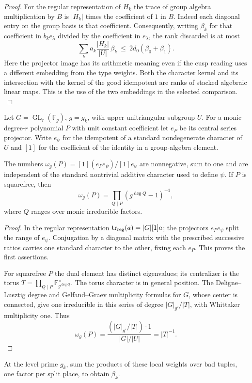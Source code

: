 \begin{proof}
For the regular representation of $H_k$ the trace of group
algebra multiplication by $B$ is $|H_k|$ times the coefficient
of $1$ in $B$. Indeed each diagonal entry on the group basis
is that coefficient. Consequently, writing $\beta_k$ for that
coefficient in $b_ke_\lambda$ divided by the coefficient in
$e_\lambda$, the rank discarded is at most
\begin{equation}\label{eq:row-bad-share}
 \sum_k a_k\frac{|H_k|}{|U|}\,\beta_k
 \ \le\ 2d_0(\beta_0+\beta_1).
\end{equation}
Here the projector image has its arithmetic meaning even if the
cusp reading uses a different embedding from the type weights.
Both the character kernel and its intersection with the kernel of
the good idempotent are ranks of stacked algebraic linear maps.
This is the use of the two embeddings in the selected comparison.
\label{cor:paired-good-share-2}

\end{proof}

Let \(G=\operatorname{GL}_r(\mathbb F_g)\), \(g=g_k\), with upper
unitriangular subgroup \(U\). For a monic degree-\(r\) polynomial
\(P\) with unit constant coefficient let \(e_P\) be its central
series projector. Write \(e_\psi\) for the idempotent of a standard
nondegenerate character of \(U\) and \([1]\) for the coefficient
of the identity in a group-algebra element.

\begin{lemma}
The numbers \(\omega_g(P)=[1](e_Pe_\psi)/[1]e_\psi\) are
nonnegative, sum to one and are independent of the standard
nontrivial additive character used to define \(\psi\). If \(P\)
is squarefree, then
\[
        \omega_g(P)=\prod_{Q\mid P}(g^{\deg Q}-1)^{-1},
\]
where \(Q\) ranges over monic irreducible factors.
\end{lemma}
\begin{proof}
In the regular representation \(\operatorname{tr}_{\rm reg}(a)
=|G|[1]a\); the projectors \(e_Pe_\psi\) split the range of
\(e_\psi\). Conjugation by a diagonal matrix with the prescribed
successive ratios carries one standard character to the other,
fixing each \(e_P\). This proves the first assertions.

For squarefree \(P\) the dual element has distinct eigenvalues;
its centralizer is the torus \(T=\prod_{Q\mid P}\mathbb F_{g^{\deg Q}}^\times\).
The torus character is in general position. The Deligne--Lusztig
degree and Gelfand--Graev multiplicity formulas for \(G\), whose
center is connected, give one irreducible in this series of degree
\(|G|_{g'}/|T|\), with Whittaker multiplicity one. Thus
\[
 \omega_g(P)=\frac{(|G|_{g'}/|T|)\cdot1}{|G|/|U|}=|T|^{-1}.
\]
\cite[\S\S5.24, 7.1, 7.4 and 10.7]{deligne-lusztig-finite}
\end{proof}
At the level prime \(g_k\), sum the products of these local
weights over bad tuples, one factor per split place, to obtain
\(\beta_k\). \label{cor:paired-good-share-3}

